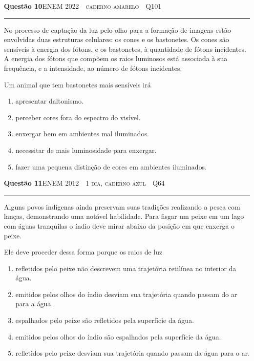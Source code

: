 \documentclass[11pt,a4paper]{article}
\newcommand{\fonte}[1]{{\small\scshape\color{grafite}#1}}
\newcommand{\enem}[3]{\fonte{ENEM #1 \,\textperiodcentered\, #2 \,\textperiodcentered\, Q#3}}
\newenvironment{questao}[2]{%
  \needspace{6\baselineskip}
  \par\addvspace{1.6em}
  {\large\bfseries\color{vinho}Quest\~ao #1}\hfill #2\\[-0.55em]
  {\color{black!25}\rule{\linewidth}{0.4pt}}
  \par\nobreak\smallskip
}{\par\addvspace{0.4em}}
\begin{document}
\begin{questao}{10}{\enem{2022}{caderno amarelo}{101}}
No processo de capta\c{c}\~ao da luz pelo olho para a forma\c{c}\~ao de imagens
est\~ao envolvidas duas estruturas celulares: os cones e os bastonetes. Os
cones s\~ao sens\'iveis \`a energia dos f\'otons, e os bastonetes, \`a
quantidade de f\'otons incidentes. A energia dos f\'otons que comp\~oem os
raios luminosos est\'a associada \`a sua frequ\^encia, e a intensidade, ao
n\'umero de f\'otons incidentes.

Um animal que tem bastonetes mais sens\'iveis ir\'a
\begin{enumerate}
  \item apresentar daltonismo.
  \item perceber cores fora do espectro do vis\'ivel.
  \item enxergar bem em ambientes mal iluminados.
  \item necessitar de mais luminosidade para enxergar.
  \item fazer uma pequena distin\c{c}\~ao de cores em ambientes iluminados.
\end{enumerate}
\end{questao}

\begin{questao}{11}{\enem{2012}{1\textordmasculine{} dia, caderno azul}{64}}
Alguns povos ind\'igenas ainda preservam suas tradi\c{c}\~oes realizando a
pesca com lan\c{c}as, demonstrando uma not\'avel habilidade. Para fisgar um
peixe em um lago com \'aguas tranquilas o \'indio deve mirar abaixo da
posi\c{c}\~ao em que enxerga o peixe.

Ele deve proceder dessa forma porque os raios de luz
\begin{enumerate}
  \item refletidos pelo peixe n\~ao descrevem uma trajet\'oria retil\'inea no
        interior da \'agua.
  \item emitidos pelos olhos do \'indio desviam sua trajet\'oria quando passam
        do ar para a \'agua.
  \item espalhados pelo peixe s\~ao refletidos pela superf\'icie da \'agua.
  \item emitidos pelos olhos do \'indio s\~ao espalhados pela superf\'icie da
        \'agua.
  \item refletidos pelo peixe desviam sua trajet\'oria quando passam da \'agua
        para o ar.
\end{enumerate}
\end{questao}
\end{document}
